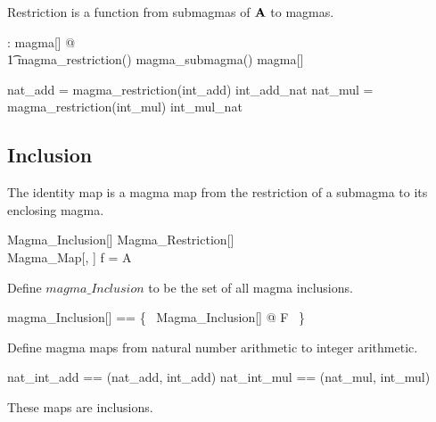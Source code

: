 \documentclass{amsart}
\begin{document}
\begin{remark}
Restriction is a function from submagmas of $\mathbf{A}$ to magmas.

\begin{zed}
	\forall \strucA: magma[\setT] @ \\
	\t1	magma\_restriction(\strucA) \in magma\_submagma(\strucA) \fun magma[\setT]
\end{zed}

\end{remark}

\begin{example}

\begin{zed}
	nat\_add = magma\_restriction(int\_add) int\_add\_nat
\also
	nat\_mul = magma\_restriction(int\_mul) int\_mul\_nat
\end{zed}

\end{example}

\subsection{Inclusion}

The identity map is a magma map from the restriction of a submagma to its
enclosing magma.

\begin{schema}{Magma\_Inclusion}[\genT]
	Magma\_Restriction[\genT] \\
	Magma\_Map[\genT, \genT]
\where
	f = \id A
\end{schema}

Define $magma\_Inclusion$ to be the set of all magma inclusions.

\begin{zed}
	magma\_Inclusion[\genT] == \{~ Magma\_Inclusion[\genT] @ F ~\}
\end{zed}

\begin{example}
Define magma maps from natural number arithmetic to integer arithmetic.

\begin{zed}
	nat\_int\_add == (nat\_add, int\_add) \mapsto \id \nat
\also
	nat\_int\_mul == (nat\_mul, int\_mul) \mapsto \id \nat
\end{zed}

These maps are inclusions.


\end{example}
\end{document}
